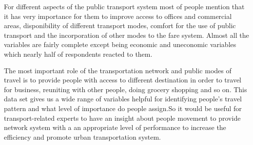 \documentclass[
11pt, %
oneside, %
english, %
singlespacing, %
]{macthesis} %
\begin{document}
For different aspects of the public transport system most of people mention that it has very importance for them to improve access to offices and commercial areas, disponibility of different transport modes, comfort for the use of public transport and the incorporation of other modes to the fare system. Almost all the variables are fairly complete except being economic and uneconomic variables which nearly half of respondents reacted to them.

The most important role of the transportation network and public modes of travel is to provide people with access to different destination in order to travel for business, reuniting with other people, doing grocery shopping and so on. This data set gives us a wide range of variables helpful for identifying people's travel pattern and what level of importance do people assign.So it would be useful for transport-related experts to have an insight about people movement to provide network system with a an appropriate level of performance to increase the efficiency and promote urban transportation system.
\end{document}
